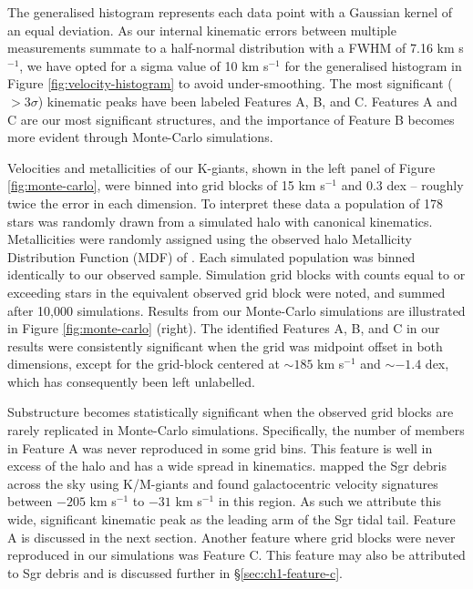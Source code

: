 	
The generalised histogram represents each data point with a Gaussian kernel of an equal deviation. As our internal kinematic errors between multiple measurements summate to a half-normal distribution with a FWHM of 7.16 km s$^{-1}$, we have opted for a sigma value of 10 km s$^{-1}$ for the generalised histogram in Figure \ref{fig:velocity-histogram} to avoid under-smoothing. The most significant ($>3\sigma$) kinematic peaks have been labeled Features A, B, and C. Features A and C are our most significant structures, and the importance of Feature B becomes more evident through Monte-Carlo simulations. 



	Velocities and metallicities of our K-giants, shown in the left panel of Figure \ref{fig:monte-carlo}, were binned into grid blocks of 15 km s$^{-1}$ and 0.3 dex \--- roughly twice the error in each dimension. To interpret these data a population of 178 stars was randomly drawn from a simulated halo with canonical kinematics. Metallicities were randomly assigned using the observed halo Metallicity Distribution Function (MDF) of \citet{Ryan;Norris_1991}. Each simulated population was binned identically to our observed sample. Simulation grid blocks with counts equal to or exceeding stars in the equivalent observed grid block were noted, and summed after 10,000 simulations. Results from our Monte-Carlo simulations are illustrated in Figure \ref{fig:monte-carlo} (right). The identified Features A, B, and C in our results were consistently significant when the grid was midpoint offset in both dimensions, except for the grid-block centered at $\sim185$ km s$^{-1}$ and $\sim-1.4$ dex, which has consequently been left unlabelled.
	
	 Substructure becomes statistically significant when the observed grid blocks are rarely replicated in Monte-Carlo simulations. Specifically, the number of members in Feature A was never reproduced in some grid bins. This feature is well in excess of the halo and has a wide spread in kinematics. \citet{Chou;et-al_2007} mapped the Sgr debris across the sky using K/M-giants and found galactocentric velocity signatures between $-205$ km s$^{-1}$ to $-31$ km s$^{-1}$ in this region. As such we attribute this wide, significant kinematic peak as the leading arm of the Sgr tidal tail. Feature A is discussed in the next section. Another feature where grid blocks were never reproduced in our simulations was Feature C. This feature may also be attributed to Sgr debris and is discussed further in \S\ref{sec:ch1-feature-c}.
	 	
